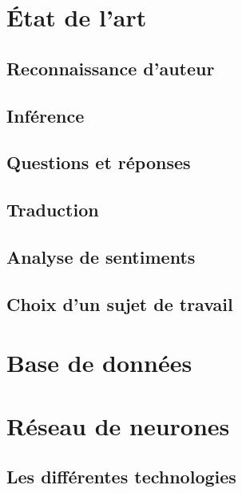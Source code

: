 \documentclass[11pt,a4paper]{article}
\begin{document}
%
%

\cleardoublepage
%
%

\setcounter{page}{1}


\newcommand{\sectionbreak}{\clearpage}

%
%

%
%

\section{\'Etat de l'art}
\subsection{Reconnaissance d'auteur}
\subsection{Inférence}
\subsection{Questions et réponses}
\subsection{Traduction}
\subsection{Analyse de sentiments}
\subsection{Choix d'un sujet de travail}

\section{Base de données}




\section{Réseau de neurones}
\subsection{Les différentes technologies}
\end{document}

